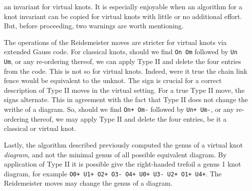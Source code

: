         an invariant for virtual knots. It is especially enjoyable when an
        algorithm for a knot invariant can be copied for virtual knots with
        little or no additional effort. But, before proceeding, two warnings
        are worth mentioning.
        \par\hfill\par
        The operations of the Reidemeister moves are stricter for virtual knots
        via extended Gauss code. For classical knots, should we find
        \texttt{On Om} followed by \texttt{Un Um}, or any re-ordering thereof,
        we can apply Type II and delete the four entries from the code. This is
        not so for virtual knots. Indeed, were it true the chain link fence
        would be equivalent to the unknot. The sign is crucial for a correct
        description of Type II moves in the virtual setting. For a true
        Type II move, the signs alternate. This in agreement with the fact that
        Type II does not change the writhe of a diagram. So, should we find
        \texttt{On+ Om-} followed by \texttt{Un+ Um-}, or any re-ordering
        thereof, we may apply Type II and delete the four entries, be it a
        classical or virtual knot.
        \par\hfill\par
        Lastly, the algorithm described previously computed the genus of a
        virtual knot \textit{diagram}, and not the minimal genus of all
        possible equivalent diagram. By application of Type II it is possible
        give the right-handed trefoil a genus 1 knot diagram, for example
        \texttt{O0+ U1+ O2+ O3- O4+ U0+ U3- U2+ O1+ U4+}. The Reidemeister
        moves may change the genus of a diagram.
